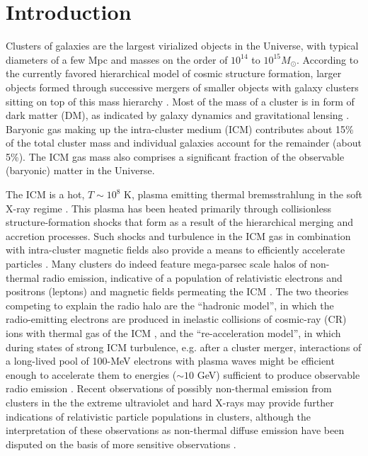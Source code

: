 \documentclass[12pt,manuscript]{aastex}
\begin{document}
%
%

\section{Introduction}
Clusters of galaxies are the largest virialized objects in the Universe, with typical diameters of
a few Mpc and masses on the order of $10^{14}$ to $10^{15} M_{\odot}$. According to the currently
favored hierarchical model of cosmic structure formation, larger objects formed through successive
mergers of smaller objects with galaxy clusters sitting on top of this mass hierarchy
\citep[see][for a review]{article:Voit:2005}. Most of the mass of a cluster is in form of dark
matter (DM), as indicated by galaxy dynamics and gravitational lensing
\citep{article:DiaferioSchindlerDolag:2008}. Baryonic gas making up the intra-cluster medium (ICM)
contributes about 15\% of the total cluster mass and individual galaxies account for the remainder
(about 5\%). The ICM gas mass also comprises a significant fraction of the observable (baryonic)
matter in the Universe.

The ICM is a hot, $T\sim 10^{8}$ K, plasma emitting thermal bremsstrahlung in the soft X-ray regime
\citep[see, e.g.,][]{article:Petrosian:2001}. This plasma has been heated primarily through
collisionless structure-formation shocks that form as a result of the hierarchical merging and
accretion processes. Such shocks and turbulence in the ICM gas in combination with intra-cluster
magnetic fields also provide a means to efficiently accelerate particles \citep[see,
e.g.,][]{article:ColafrancescoBlasi:1998, article:Ryu_etal:2003}. Many clusters do indeed feature
mega-parsec scale halos of non-thermal radio emission, indicative of a population of relativistic
electrons and positrons (leptons) and magnetic fields permeating the ICM
\citep{article:Cassano_etal:2010}. The two theories competing to explain the radio halo are the
``hadronic model'', in which the radio-emitting electrons are produced in inelastic collisions of
cosmic-ray (CR) ions with thermal gas of the ICM \citep{article:Dennison:1980,
  article:EnsslinPfrommerMiniatiSubramanian:2011}, and the ``re-acceleration model'', in which
during states of strong ICM turbulence, e.g. after a cluster merger, interactions of a long-lived
pool of 100-MeV electrons with plasma waves might be efficient enough to accelerate them to energies
($\sim 10$ GeV) sufficient to produce observable radio emission \citep[][and references
therein]{article:BrunettiLazarian:2010}. Recent observations of possibly non-thermal emission from
clusters in the the extreme ultraviolet \citep[EUV; ][]{article:SarazinLieu:1998} and hard X-rays
\citep{article:RephaeliGruber:2002, article:Fusco-Femiano_etal:2004, article:Eckert_etal:2007} may
provide further indications of relativistic particle populations in clusters, although the
interpretation of these observations as non-thermal diffuse emission have been disputed on the basis
of more sensitive observations \citep[see, e.g.,][]{article:Ajello_etal:2009,
  article:Ajello_etal:2010, article:Wik_etal:2009}.
\end{document}
